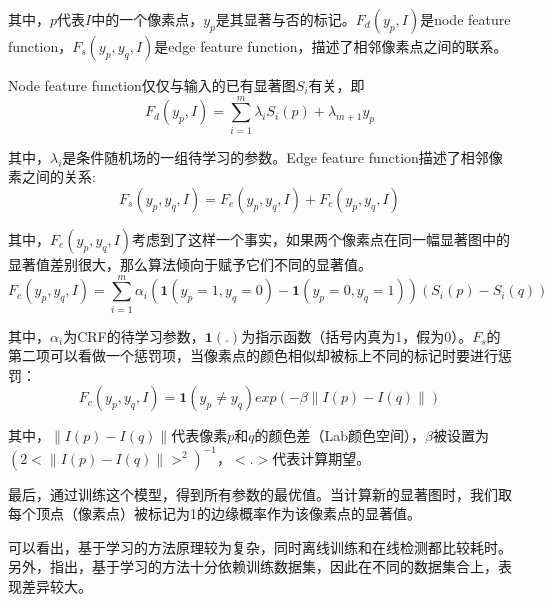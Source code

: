 其中，$p$代表$I$中的一个像素点，$y_p$是其显著与否的标记。$F_d(y_p, I)$是node feature function，$F_s(y_p,y_q,I)$是edge feature function，描述了相邻像素点之间的联系。

Node feature function仅仅与输入的已有显著图$S_i$有关，即
\begin{equation}
F_d(y_p, I) = \sum_{i=1}^{m} \lambda_iS_i(p) + \lambda_{m+1}y_p
\end{equation}

其中，$\lambda_i$是条件随机场的一组待学习的参数。Edge feature function描述了相邻像素之间的关系:
\begin{equation}
F_s(y_p,y_q,I) = F_e(y_p,y_q,I) + F_c(y_p,y_q,I)
\end{equation}

其中，$F_e(y_p,y_q,I)$考虑到了这样一个事实，如果两个像素点在同一幅显著图中的显著值差别很大，那么算法倾向于赋予它们不同的显著值。
\begin{equation}
  F_e(y_p,y_q,I) = \sum_{i=1}^{m}\alpha_i(\textbf{1}(y_p=1,y_q=0)-\textbf{1}(y_p=0,y_q=1))(S_i(p)-S_i(q))
\end{equation}

其中，$\alpha_i$为CRF的待学习参数，$\textbf{1}(.)$为指示函数（括号内真为1，假为0）。$F_s$的第二项可以看做一个惩罚项，当像素点的颜色相似却被标上不同的标记时要进行惩罚：
\begin{equation}
F_c(y_p,y_q,I)=\textbf{1}(y_p \not= y_q) exp(-\beta \parallel I(p)-I(q) \parallel )
\end{equation}

其中，$\parallel I(p)-I(q) \parallel$代表像素$p$和$q$的颜色差（Lab颜色空间），$\beta$被设置为$(2<\parallel I(p)-I(q) \parallel>^2)^{-1}$，$<.>$代表计算期望。

最后，通过训练这个模型，得到所有参数的最优值。当计算新的显著图时，我们取每个顶点（像素点）被标记为1的边缘概率作为该像素点的显著值。

可以看出，基于学习的方法原理较为复杂，同时离线训练和在线检测都比较耗时。另外，\citep{liu2011learning}指出，基于学习的方法十分依赖训练数据集，因此在不同的数据集合上，表现差异较大。


